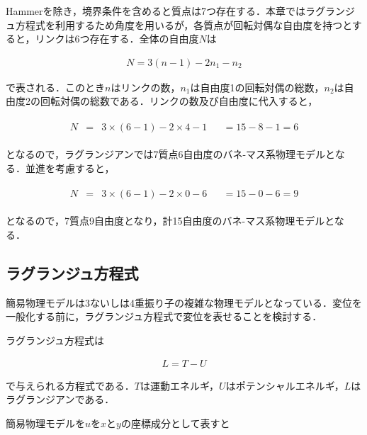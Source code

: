 Hammerを除き，境界条件を含めると質点は7つ存在する．本章ではラグランジュ方程式を利用するため角度を用いるが，各質点が回転対偶な自由度を持つとすると，リンクは6つ存在する．全体の自由度$N$は

\begin{eqnarray}
    N = 3(n - 1) - 2n_1-n_2
\end{eqnarray}

で表される．このとき$n$はリンクの数，$n_1$は自由度1の回転対偶の総数，$n_2$は自由度2の回転対偶の総数である．リンクの数及び自由度に代入すると，

\begin{eqnarray}
    \begin{matrix}
        N &=& 3\times (6 - 1) - 2 \times 4 - 1 
          & & = 15 - 8 - 1 = 6
    \end{matrix}
\end{eqnarray}

となるので，ラグランジアンでは7質点6自由度のバネ-マス系物理モデルとなる．並進を考慮すると，

\begin{eqnarray}
    \begin{matrix}
        N &=& 3\times (6 - 1) - 2 \times 0 - 6
          & & = 15 - 0 - 6 = 9
    \end{matrix}
\end{eqnarray}

となるので，7質点9自由度となり，計15自由度のバネ-マス系物理モデルとなる．



\subsection{ラグランジュ方程式}

簡易物理モデルは3ないしは4重振り子の複雑な物理モデルとなっている．変位を一般化する前に，ラグランジュ方程式で変位を表せることを検討する．

ラグランジュ方程式は

\begin{eqnarray}
    L = T - U    
\end{eqnarray}

で与えられる方程式である．$T$は運動エネルギ，$U$はポテンシャルエネルギ，$L$はラグランジアンである．

簡易物理モデルを$u$を$x$と$y$の座標成分として表すと

